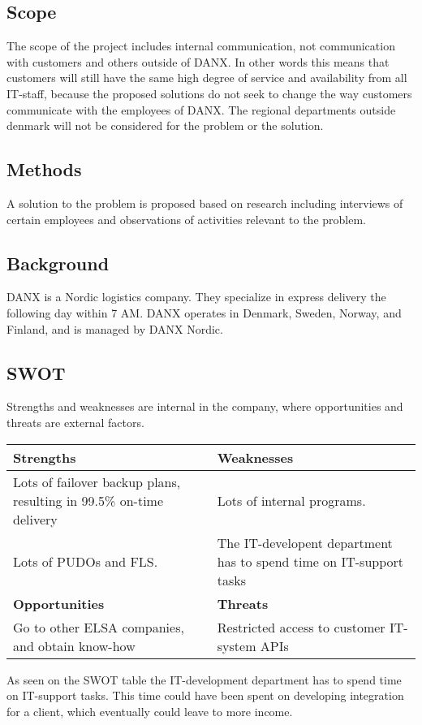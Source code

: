 \subsection{Scope}
The scope of the project includes internal communication, not communication with customers and others outside of DANX. In other words this means that customers will still have the same high degree of service and availability from all IT-staff, because the proposed solutions do not seek to change the way customers communicate with the employees of DANX. The regional departments outside denmark will not be considered for the problem or the solution.

\subsection{Methods}
A solution to the problem is proposed based on research including interviews of certain employees and observations of activities relevant to the problem.

\subsection{Background}
DANX is a Nordic logistics company. They specialize in express delivery the following day within 7 AM. DANX operates in Denmark, Sweden, Norway, and Finland, and is managed by DANX Nordic.

\subsection{SWOT}
Strengths and weaknesses are internal in the company, where opportunities and threats are external factors.

\vspace{2mm}
\begin{tabular}{| p{} | p{} |}
\hline
\rowcolor{GR}
\textbf{Strengths} & \textbf{Weaknesses} \\ \hline
Lots of failover backup plans, resulting in 99.5\% on-time delivery & Lots of internal programs.
\\ \hline
Lots of PUDOs and FLS. & The IT-developent department has to spend time on IT-support tasks \\ \hline \hline
\rowcolor{GR}
\textbf{Opportunities} & \textbf{Threats} \\ \hline
Go to other ELSA companies, and obtain know-how & Restricted access to customer IT-system APIs \\ \hline
\end{tabular}
\qquad

As seen on the SWOT table the IT-development department has to spend time on IT-support tasks. This time could have been spent on developing integration for a client, which eventually could leave to more income.